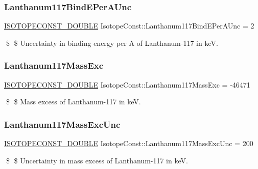 \subsubsection{\texorpdfstring{Lanthanum117\+Bind\+E\+Per\+A\+Unc}{Lanthanum117BindEPerAUnc}}
{\footnotesize\ttfamily \mbox{\hyperlink{group___isotope_const-_macros_ga8f45a7272ce02c0b4c65c44636ed719a}{I\+S\+O\+T\+O\+P\+E\+C\+O\+N\+S\+T\+\_\+\+D\+O\+U\+B\+LE}} Isotope\+Const\+::\+Lanthanum117\+Bind\+E\+Per\+A\+Unc = 2}

\$ \$ Uncertainty in binding energy per A of Lanthanum-\/117 in keV. \mbox{\label{group___isotope_const-_lanthanum-_la117_ga84c6548f18a532b684d511aff34d673f}} 
\subsubsection{\texorpdfstring{Lanthanum117\+Mass\+Exc}{Lanthanum117MassExc}}
{\footnotesize\ttfamily \mbox{\hyperlink{group___isotope_const-_macros_ga8f45a7272ce02c0b4c65c44636ed719a}{I\+S\+O\+T\+O\+P\+E\+C\+O\+N\+S\+T\+\_\+\+D\+O\+U\+B\+LE}} Isotope\+Const\+::\+Lanthanum117\+Mass\+Exc = -\/46471}

\$ \$ Mass excess of Lanthanum-\/117 in keV. \mbox{\label{group___isotope_const-_lanthanum-_la117_gadcf2d0aaaf43251534422a2ca302a89a}} 
\subsubsection{\texorpdfstring{Lanthanum117\+Mass\+Exc\+Unc}{Lanthanum117MassExcUnc}}
{\footnotesize\ttfamily \mbox{\hyperlink{group___isotope_const-_macros_ga8f45a7272ce02c0b4c65c44636ed719a}{I\+S\+O\+T\+O\+P\+E\+C\+O\+N\+S\+T\+\_\+\+D\+O\+U\+B\+LE}} Isotope\+Const\+::\+Lanthanum117\+Mass\+Exc\+Unc = 200}

\$ \$ Uncertainty in mass excess of Lanthanum-\/117 in keV. \mbox{\label{group___isotope_const-_lanthanum-_la117_gaacfb7d3045d678250d7690af61bc6340}} 
